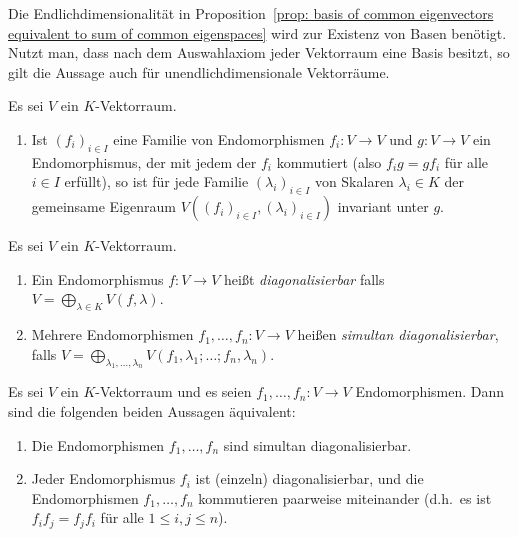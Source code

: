 \documentclass[a4paper,10pt]{article}
\begin{document}
\begin{remark}
  Die Endlichdimensionalität in Proposition~\ref{prop: basis of common eigenvectors equivalent to sum of common eigenspaces} wird zur Existenz von Basen benötigt.
  Nutzt man, dass nach dem Auswahlaxiom jeder Vektorraum eine Basis besitzt, so gilt die Aussage auch für unendlichdimensionale Vektorräume.
\end{remark}


\begin{lemma}
  Es sei $V$ ein $K$-Vektorraum.
  \begin{enumerate}
    \item
     Ist $(f_i)_{i \in I}$ eine Familie von Endomorphismen $f_i \colon V \to V$ und $g \colon V \to V$ ein Endomorphismus, der mit jedem der $f_i$ kommutiert (also $f_i g = g f_i$ für alle $i \in I$ erfüllt), so ist für jede Familie $(\lambda_i)_{i \in I}$ von Skalaren $\lambda_i \in K$ der gemeinsame Eigenraum $V((f_i)_{i \in I}, (\lambda_i)_{i \in I})$ invariant unter $g$.
  \end{enumerate}
\end{lemma}


\begin{definition}
  Es sei $V$ ein $K$-Vektorraum.
  \begin{enumerate}[leftmargin=*]
    \item
      Ein Endomorphismus $f \colon V \to V$ heißt \emph{diagonalisierbar} falls $V = \bigoplus_{\lambda \in K} V(f, \lambda)$.
    \item
      Mehrere Endomorphismen $f_1, \dotsc, f_n \colon V \to V$ heißen \emph{simultan diagonalisierbar}, falls $V = \bigoplus_{\lambda_1, \dotsc, \lambda_n} V(f_1, \lambda_1; \dotsc; f_n, \lambda_n)$.
  \end{enumerate}
\end{definition}


\begin{theorem}
  Es sei $V$ ein $K$-Vektorraum und es seien $f_1, \dotsc, f_n \colon V \to V$ Endomorphismen.
  Dann sind die folgenden beiden Aussagen äquivalent:
  \begin{enumerate}
    \item
      Die Endomorphismen $f_1, \dotsc, f_n$ sind simultan diagonalisierbar.
    \item
      Jeder Endomorphismus $f_i$ ist (einzeln) diagonalisierbar, und die Endomorphismen $f_1, \dotsc, f_n$ kommutieren paarweise miteinander (d.h.\ es ist $f_i f_j = f_j f_i$ für alle $1 \leq i,j \leq n$).
  \end{enumerate}
\end{theorem}
\end{document}
